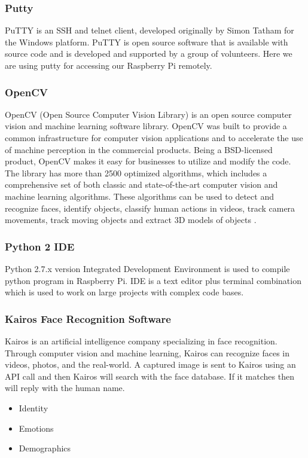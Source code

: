 \documentclass[sigconf]{acmart}
\begin{document}
\subsubsection{Putty}
PuTTY is an SSH and telnet client, developed originally by Simon Tatham for the Windows platform. PuTTY is open source software that is available with source code and is developed and supported by a group of volunteers. Here we are using putty for accessing our Raspberry Pi remotely.

\subsubsection{OpenCV}
OpenCV (Open Source Computer Vision Library) is an open source computer vision and machine learning software library. OpenCV was built to provide a common infrastructure for computer vision applications and to accelerate the use of machine perception in the commercial products. Being a BSD-licensed product, OpenCV makes it easy for businesses to utilize and modify the code. The library has more than 2500 optimized algorithms, which includes a comprehensive set of both classic and state-of-the-art computer vision and machine learning algorithms. These algorithms can be used to detect and recognize faces, identify objects, classify human actions in videos, track camera movements, track moving objects and extract 3D models of objects \cite{opencv}.

\subsubsection{Python 2 IDE}
Python 2.7.x version Integrated Development Environment is used to compile python program in Raspberry Pi. IDE is a text editor plus terminal combination which is used to work on large projects with complex code bases.

\subsubsection{Kairos Face Recognition Software}
Kairos is an artificial intelligence company specializing in face recognition. Through computer vision and machine learning, Kairos can recognize faces in videos, photos, and the real-world. A captured image is sent to Kairos using an API call and then Kairos will search with the face database. If it matches then will reply with the human name.

\begin{itemize}
\item Identity
\item Emotions
\item Demographics
\end{itemize}
\end{document}
